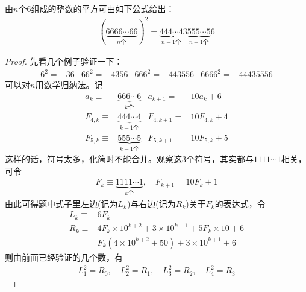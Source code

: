 \begin{example}[6组成的数字的平方]
  由$n$个6组成的整数的平方可由如下公式给出：
  \begin{align*}
    \left( \underbrace{6666\cdots 66}_{n\text{个}} \right)^2 =
    \underbrace{444\cdots 4}_{n-1\text{个}}3\underbrace{555\cdots 5}_{n-1\text{个}}6
  \end{align*}
\end{example}
\begin{proof}
  先看几个例子验证一下：
  \begin{align*}
    6^2 ={}& 36 & 66^2 ={}& 4356 & 666^2={}& 443556 & 6666^2={}& 44435556
  \end{align*}
  可以对$n$用数学归纳法。记
  \begin{align*}
    a_k \equiv{}& \underbrace{666\cdots 6}_{k\text{个}}      & a_{k+1}   ={}& 10a_k + 6\\
    F_{4,k} \equiv{}& \underbrace{444\cdots 4}_{k-1\text{个}} & F_{4,k+1} ={}& 10F_{4,k} + 4 \\
    F_{5,k} \equiv{}& \underbrace{555\cdots 5}_{k-1\text{个}} & F_{5,k+1} ={}& 10F_{5,k} + 5
  \end{align*}
  这样的话，符号太多，化简时不能合并。观察这3个符号，其实都与$1111\cdots1$相关，可令
  \begin{align*}
    F_k \equiv \underbrace{1111\cdots1}_{k\text{个}}, \quad F_{k+1} = 10F_k + 1
  \end{align*}
  由此可得题中式子里左边(记为$L_k$)与右边(记为$R_k$)关于$F_k$的表达式，令
  \begin{align*}
    L_k \equiv{}& 6F_k\\
    R_k \equiv{}& 4F_k\times10^{k+2} + 3\times10^{k+1} + 5F_k\times10 + 6\\
             ={}& F_k\left(4\times10^{k+2} + 50\right) + 3\times 10^{k+1} + 6
  \end{align*}
  则由前面已经验证的几个数，有
  \begin{align*}
    L_1^2 = R_0, \quad L_2^2 = R_1, \quad L_3^2 = R_2, \quad L_4^2 = R_3
  \end{align*}


\end{proof}
